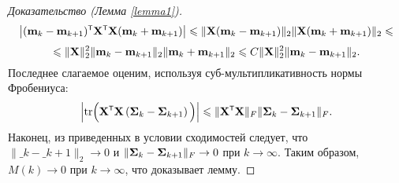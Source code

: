 \begin{proof}[Доказательство (Лемма \ref{lemma1})]
    \[ \big| (\bm_k - \bm_{k+1})\T \bX\T\bX (\bm_k + \bm_{k+1}) \big| \leqslant \| \bX (\bm_k - \bm_{k+1}) \|_2 \| \bX (\bm_k + \bm_{k+1}) \|_2 \leqslant \]
    \[ \leqslant \| \mathbf{X} \|_2^2 \| \mathbf{m}_k - \mathbf{m}_{k+1} \|_2 \| \mathbf{m}_k + \mathbf{m}_{k+1} \|_2 \leqslant C \| \mathbf{X} \|_2^2 \| \mathbf{m}_k - \mathbf{m}_{k+1} \|_2. \]
    Последнее слагаемое оценим, используя суб-мультипликативность нормы Фробениуса:
    \[ \Big| \text{tr} \Big( \bX\T\bX \left( \bSigma_k - \bSigma_{k+1} \right) \Big) \Big| \leqslant \| \bX\T\bX \|_F \| \bSigma_k - \bSigma_{k+1} \|_F. \]
    Наконец, из приведенных в условии сходимостей следует, что $\| \bm_k - \bm_{k+1} \|_2 \to 0$ и $\| \boldsymbol{\Sigma}_k - \boldsymbol{\Sigma}_{k+1} \|_{F} \to 0$ при $k \to \infty$. Таким образом, $M(k) \to 0$ при $k \to \infty$, что доказывает лемму.
    
    
\end{proof}